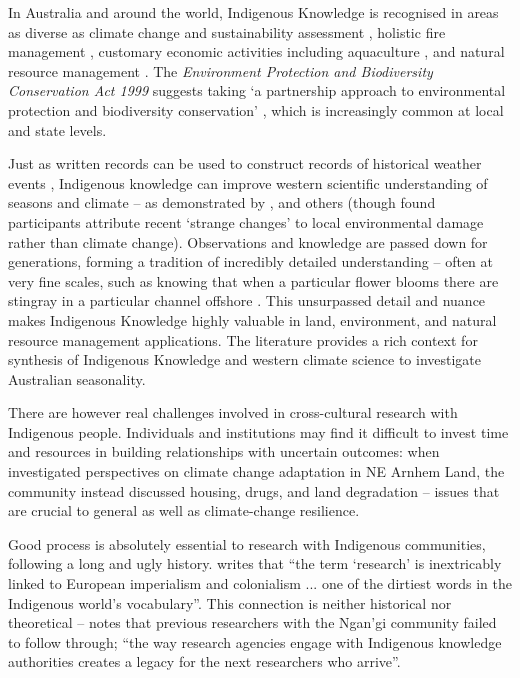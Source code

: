 In Australia and around the world, Indigenous Knowledge is recognised
in areas as diverse as climate change and sustainability assessment
\citep[eg.][]{cochran2015}, holistic fire management \citep[eg.][]{clarke2009,price2012},
customary economic activities including aquaculture \citep{woodward2012a}, and
natural resource management \citep[eg.][]{prober2011}.  The \textit{Environment
Protection and Biodiversity Conservation Act 1999} suggests taking `a
partnership approach to environmental protection and biodiversity conservation'
\citep{ens2012}, which is increasingly common at local and state levels.


Just as written records can be used to construct records of historical weather
events \citep[eg.][]{rodrigo1999}, Indigenous knowledge can improve western
scientific understanding of seasons and climate -- as demonstrated by
\citet{green2010a,clarke2009}, and others (though \citet{green2010a} found
participants attribute recent `strange changes' to local environmental damage
rather than climate change).
%
Observations and knowledge are passed down for generations, forming a
tradition of incredibly detailed understanding -- often at very fine scales,
such as knowing that when a particular flower blooms there are stingray in
a particular channel offshore \citep{barber2005}.
%
This unsurpassed detail and nuance makes Indigenous Knowledge highly valuable
in land, environment, and natural resource management applications.
The literature provides a rich context for synthesis of Indigenous Knowledge
and western climate science to investigate Australian seasonality.


There are however real challenges involved in cross-cultural research with
Indigenous people.  Individuals and institutions may find it difficult to
invest time and resources in building relationships with uncertain outcomes:
when \citet{petheram2010}
investigated perspectives on climate change adaptation in NE Arnhem Land,
the community instead discussed housing, drugs, and land degradation -- issues
that are crucial to general as well as climate-change resilience.

Good process is absolutely essential to research with Indigenous communities,
following a long and ugly history.  \citet{smith1999} writes that ``the term
`research' is inextricably linked to European imperialism and colonialism ...
one of the dirtiest words in the Indigenous world's vocabulary''. This
connection is neither historical nor theoretical -- \citet{woodward2010} notes
that previous researchers with the Ngan'gi community failed to follow through;
``the way research agencies engage with Indigenous knowledge authorities
creates a legacy for the next researchers who arrive''.


